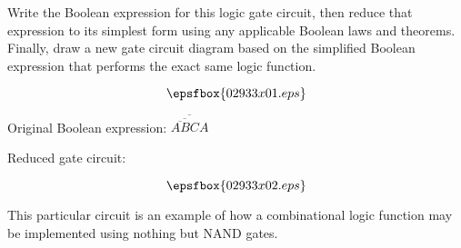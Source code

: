 

Write the Boolean expression for this logic gate circuit, then reduce that expression to its simplest form using any applicable Boolean laws and theorems.  Finally, draw a new gate circuit diagram based on the simplified Boolean expression that performs the exact same logic function.

$$\epsfbox{02933x01.eps}$$







Original Boolean expression: $\overline{\overline{\overline{AB} C} A}$

\vskip 10pt

Reduced gate circuit:

$$\epsfbox{02933x02.eps}$$







This particular circuit is an example of how a combinational logic function may be implemented using nothing but NAND gates.




